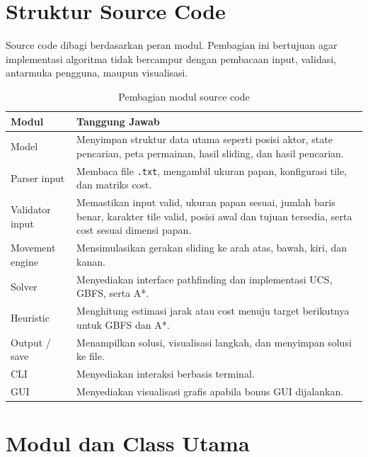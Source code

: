 \section{Struktur Source Code}

Source code dibagi berdasarkan peran modul. 
Pembagian ini bertujuan agar implementasi algoritma tidak bercampur dengan pembacaan input, validasi, antarmuka pengguna, maupun visualisasi.

\begin{table}[H]
	\centering
	\caption{Pembagian modul source code}
	\begin{tabular}{|p{4cm}|p{10cm}|}
		\hline
		\rowcolor{green!15}
		\textbf{Modul} & \textbf{Tanggung Jawab} \\
		\hline
		Model & Menyimpan struktur data utama seperti posisi aktor, state pencarian, peta permainan, hasil sliding, dan hasil pencarian. \\
		\hline
		Parser input & Membaca file \texttt{.txt}, mengambil ukuran papan, konfigurasi tile, dan matriks cost. \\
		\hline
		Validator input & Memastikan input valid, ukuran papan sesuai, jumlah baris benar, karakter tile valid, posisi awal dan tujuan tersedia, serta cost sesuai dimensi papan. \\
		\hline
		Movement engine & Mensimulasikan gerakan sliding ke arah atas, bawah, kiri, dan kanan. \\
		\hline
		Solver & Menyediakan interface pathfinding dan implementasi UCS, GBFS, serta A*. \\
		\hline
		Heuristic & Menghitung estimasi jarak atau cost menuju target berikutnya untuk GBFS dan A*. \\
		\hline
		Output / save & Menampilkan solusi, visualisasi langkah, dan menyimpan solusi ke file. \\
		\hline
		CLI & Menyediakan interaksi berbasis terminal. \\
		\hline
		GUI & Menyediakan visualisasi grafis apabila bonus GUI dijalankan. \\
		\hline
	\end{tabular}
\end{table}

\section{Modul dan Class Utama}

\begingroup
\footnotesize
\setlength{\tabcolsep}{4pt}
\renewcommand{\arraystretch}{1.25}

